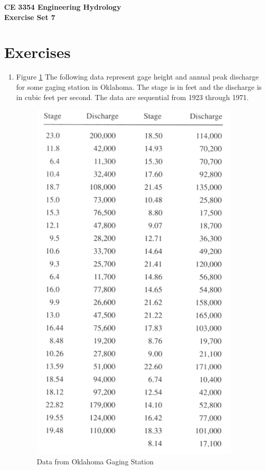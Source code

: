 \documentclass[12pt]{article}
\begin{document}
\begin{center}
{\textbf{{ CE 3354 Engineering Hydrology} \\ {Exercise Set 7}}}
\end{center}

\section*{\small{Exercises}}
\begin{enumerate}

\item Figure \ref{fig:OklahomaData} The following data represent gage height and annual peak discharge for some gaging station in Oklahoma.  The stage is in feet and the discharge is in cubic feet per second.  The data are sequential from 1923 through 1971.

\begin{figure}[h!] %
   \centering
   \includegraphics[height=7in]{OklahomaData.jpg} 
   \caption{Data from Oklahoma Gaging Station}
   \label{fig:OklahomaData}
\end{figure}


\end{enumerate}
\end{document}
